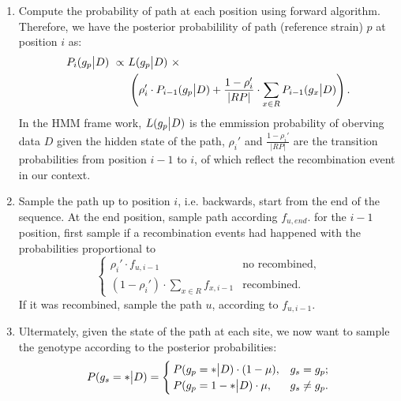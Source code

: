 \documentclass{bioinfo}
\begin{document}
\begin{methods}
\begin{enumerate}
\item Compute the probability of path at each position using forward algorithm. Therefore, we have the posterior probabilility of path (reference strain) $p$ at position $i$ as:
\begin{equation}
\begin{split}
P_i(g_p \big{|} D) ~ \propto ~ & L(g_p \big{|} D) ~ \times \\
                               & \left( \rho_i' \cdot P_{i-1}(g_p \big{|} D)  +  \frac{1-\rho_i'}{|RP|} \cdot \sum_{x\in R} P_{i-1} (g_x \big{|} D) \right).
\end{split}\label{eqn:post_path}
\end{equation}
In the HMM frame work, $L(g_p \big{|} D)$ is the emmission probability of oberving data $D$ given the hidden state of the path, $\rho_i'$ and $\frac{1-\rho_i'}{|RP|}$ are the transition probabilities from position $i-1$ to $i$, of which reflect the recombination event in our context.

\item Sample the path up to position $i$, i.e. backwards, start from the end of the sequence. At the end position, sample path according $f_{u,end}$.
for the $i-1$ position, first sample if a recombination events had happened with the probabilities proportional to
$$
\begin{cases}
\rho_i' \cdot f_{u,i-1} & \text{no recombined},\\
\displaystyle ( 1-\rho_i' ) \cdot \sum_{x\in R} f_{x,i-1} & \text{recombined}.
\end{cases}
$$
If it was recombined, sample the path $u$, according to $f_{u,i-1}$.

\item Ultermately, given the state of the path at each site, we now want to sample the genotype according to the posterior probabilities:
\begin{equation}
P(g_{s} = * \big{|} D) =
\begin{cases}
P(g_{p} = * \big{|} D) \cdot (1-\mu), & g_s = g_p;\\
P(g_{p} = 1 - * \big{|} D) \cdot \mu, & g_s \neq g_p.
\end{cases}
\label{eqn:ps0}
\end{equation}



\end{enumerate}
\end{methods}
\end{document}
